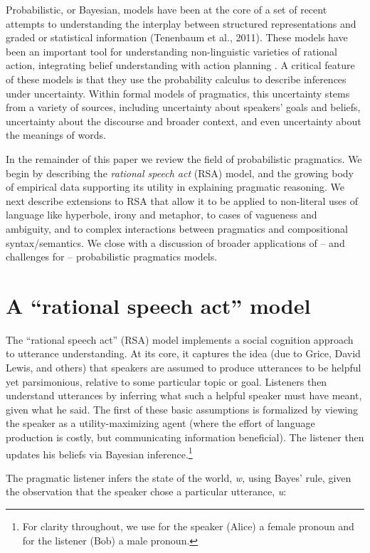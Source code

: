\documentclass[]{elsarticle}
\begin{document}
Probabilistic, or Bayesian, models have been at the core of a set of
recent attempts to understanding the interplay between structured
representations and graded or statistical information (Tenenbaum et al.,
2011). These models have been an important tool for understanding
non-linguistic varieties of rational action, integrating belief
understanding with action planning \citep{baker2009}. A
critical feature of these models is that they use the probability
calculus to describe inferences under uncertainty. Within formal models
of pragmatics, this uncertainty stems from a variety of sources,
including uncertainty about speakers' goals and beliefs, uncertainty
about the discourse and broader context, and even uncertainty about the
meanings of words.

In the remainder of this paper we review the field of probabilistic
pragmatics. We begin by describing the \emph{rational speech act}
(RSA) model, and the growing body of empirical data supporting its
utility in explaining pragmatic reasoning. We next describe extensions
to RSA that allow it to be applied to non-literal uses of language like
hyperbole, irony and metaphor, to cases of vagueness and ambiguity, and
to complex interactions between pragmatics and compositional
syntax/semantics. We close with a discussion of broader applications of
-- and challenges for -- probabilistic pragmatics models.

\section{A ``rational speech act'' model}\label{a-rational-speech-act-model}

The ``rational speech act'' (RSA) model implements a social
cognition approach to utterance understanding. At its core, it captures
the idea (due to Grice, David Lewis, and others) that speakers are assumed to
produce utterances to be helpful yet parsimonious, relative to some
particular topic or goal. Listeners then understand utterances by
inferring what such a helpful speaker must have meant, given what he
said. The first of these basic assumptions is formalized by viewing the speaker
as a utility-maximizing agent (where the effort of language production
is costly, but communicating information beneficial). The listener then
updates his beliefs via Bayesian inference.\footnote{For clarity throughout, we use for the speaker (Alice) a female pronoun and for the listener (Bob) a male pronoun.}

The pragmatic listener infers the state of the world, \emph{w,} using
Bayes' rule, given the observation that the speaker chose a particular
utterance, \emph{u}:
\end{document}
